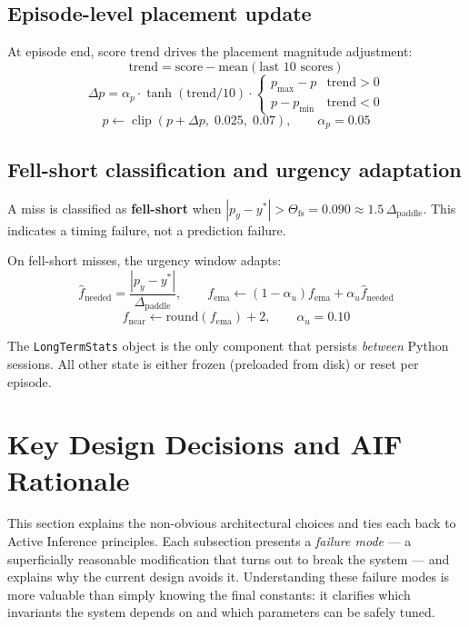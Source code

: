 \documentclass[12pt, a4paper]{article}
\newcommand{\1}{\mathbf{1}}
\newcommand{\clip}{\operatorname{clip}}
\newcommand{\code}[1]{\texttt{#1}}
\begin{document}
\subsection{Episode-level placement update}

At episode end, score trend drives the placement magnitude adjustment:
\[
\text{trend} = \text{score} - \text{mean}(\text{last 10 scores})
\]
\[
\Delta p
= \alpha_p \cdot \tanh(\text{trend}/10)
  \cdot \begin{cases}
    p_\text{max} - p & \text{trend} > 0 \\
    p - p_\text{min} & \text{trend} < 0
  \end{cases}
\]
\[
p \leftarrow \clip(p + \Delta p,\; 0.025,\; 0.07),
\qquad \alpha_p = 0.05
\]

\subsection{Fell-short classification and urgency adaptation}

A miss is classified as \textbf{fell-short} when
$|p_y - y^*| > \Theta_\text{fs} = 0.090 \approx 1.5\,\Delta_\text{paddle}$.
This indicates a timing failure, not a prediction failure.

On fell-short misses, the urgency window adapts:
\[
\hat f_\text{needed}
= \frac{|p_y - y^*|}{\Delta_\text{paddle}},
\qquad
f_\text{ema} \leftarrow (1-\alpha_u) f_\text{ema} + \alpha_u \hat f_\text{needed}
\]
\[
f_\text{near} \leftarrow \text{round}(f_\text{ema}) + 2,
\qquad \alpha_u = 0.10
\]

The \code{LongTermStats} object is the only component that persists
\textit{between} Python sessions.  All other state is either frozen (preloaded
from disk) or reset per episode.

\section{Key Design Decisions and AIF Rationale}
\label{sec:18}

This section explains the non-obvious architectural choices and ties each back to
Active Inference principles.  Each subsection presents a \textit{failure mode} ---
a superficially reasonable modification that turns out to break the system ---
and explains why the current design avoids it.  Understanding these failure modes
is more valuable than simply knowing the final constants: it clarifies which
invariants the system depends on and which parameters can be safely tuned.
\end{document}
